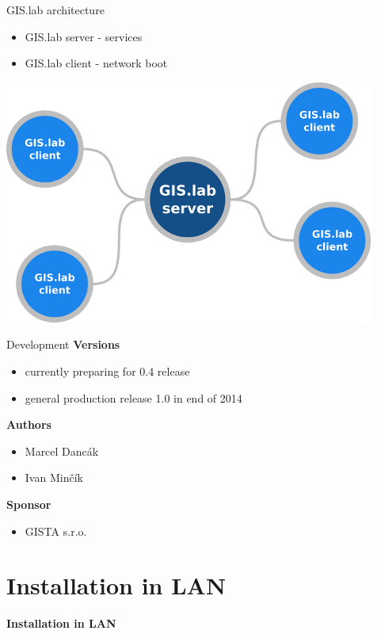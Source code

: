 \documentclass[12pt]{beamer}
\begin{document}
\begin{frame}{GIS.lab architecture}
	\begin{itemize}
		\item GIS.lab server - services
		\item GIS.lab client - network boot
	\end{itemize}
	\begin{center}
		\includegraphics[keepaspectratio=true,height=0.6\textheight]{images/gislab-architecture.png}
	\end{center}
\end{frame}


\begin{frame}{Development}
	\textbf{Versions}
	\begin{itemize}
		\item currently preparing for 0.4 release
		\item general production release 1.0 in end of 2014
	\end{itemize}

	\textbf{Authors}
	\begin{itemize}
		\item Marcel Dancák
		\item Ivan Minčík
	\end{itemize}

	\textbf{Sponsor}
	\begin{itemize}
		\item GISTA s.r.o.
	\end{itemize}
\end{frame}


\section{Installation in LAN}
\begin{frame}
	\begin{center}
		\LARGE\textbf{Installation in LAN}	
	\end{center}
\end{frame}
\end{document}
